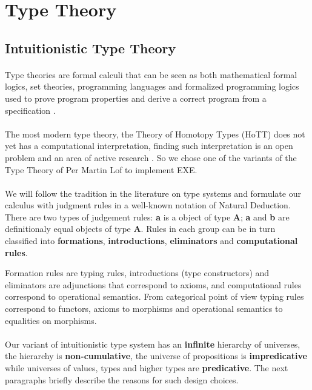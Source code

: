 \documentclass[11pt,oneside]{article}
\begin{document}
\newpage
\section{Type Theory}

\subsection{Intuitionistic Type Theory}

\paragraph{}
Type theories are formal calculi that can be seen as both mathematical
formal logics, set theories, programming languages and formalized
programming logics used to prove program properties and derive a correct program from a specification \cite{nordstrom}.

\paragraph{}
The most modern type theory, the Theory of Homotopy Types (HoTT) \cite{pelayo} does not yet has a computational interpretation, finding
such interpretation is an open problem and
an area of active research \cite{sojakova}. So we chose one of the variants of the Type Theory of Per Martin Lof \cite{lof} to implement EXE.

\paragraph{}
We will follow the tradition in the literature on type systems \cite{henk1} and formulate our calculus with judgment rules in a well-known
notation of Natural Deduction. There are two types of judgement rules: {\bf a} is a object of type {\bf A};
{\bf a} and {\bf b} are definitionaly equal objects of type {\bf A}.
Rules in each group can be in turn classified into {\bf formations}, {\bf introductions}, {\bf eliminators} and {\bf computational rules}.

Formation rules are typing rules, introductions (type constructors) and eliminators are adjunctions that correspond to axioms,
and computational rules correspond to operational semantics.
From categorical point of view typing rules correspond to functors,
axioms to morphisms and operational semantics to equalities on morphisms.

\paragraph{}
Our variant of intuitionistic type system has an {\bf infinite} hierarchy of universes,
the hierarchy is {\bf non-cumulative}, the universe of propositions is {\bf impredicative} while universes of values, types and higher types are {\bf predicative}. The next paragraphs briefly
describe the reasons for such design choices.
\end{document}
